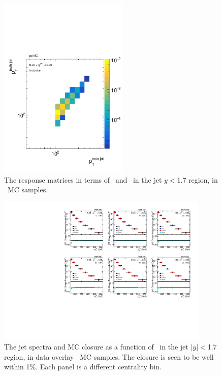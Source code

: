 \begin{figure}[ht]
\centering
\includegraphics[page=5, width=0.55\textwidth]{figures_corrections/resp_matrix_jet_pp_MC.pdf}
\caption{The response matrices in terms of \ptjetreco\ and \ptjettruth\ in the jet $y < $1.7 region, in \pp\ MC samples.}
\label{fig:pp_jetspect_respmatrix}
\end{figure}

\begin{figure}[ht]
\centering
\includegraphics[page=5, width=0.9\textwidth]{figures_corrections/spect_closure_PbPb_MC.pdf}
\caption{The jet spectra and MC closure as a function of \ptjet\ in the jet $|y| < $1.7 region, in data overlay \pbpb\ MC samples. The closure is seen to be well within 1\%. Each panel is a different centrality bin.}
\label{fig:PbPb_jetspect_closure}
\end{figure}

